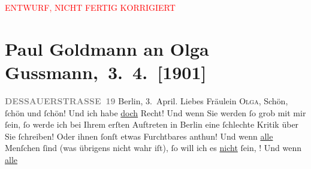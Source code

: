 
\begin{center}
            \textcolor{red}{ENTWURF, NICHT FERTIG KORRIGIERT}
                      \end{center}
            
         
         \renewcommand{\erwaehntePersonen}{Personen: Marie Glümer, Paul Goldmann, Olga Schnitzler, Elisabeth Steinrück, Ernst von Wolzogen}
         \renewcommand{\erwaehnteInstitutionen}{Institutionen: Überbrettl}
         \renewcommand{\erwaehnteOrte}{Orte: Berlin, Dessauer Straße, Wien}
         \renewcommand{\erwaehnteWerke}{}
               \section[ Paul Goldmann an Olga Gussmann, 3. 4. {[}1901{]}]{ Paul Goldmann an Olga Gussmann, 3. 4. {[}1901{]}}\nopagebreak{}\rehead{ }\begin{ledgroupsized}[t]{13cm}\normalsize\beginnumbering{} \toendnotes[C]{\smallbreak\pagebreak[2]} 
\toendnotes[C]{\smallbreak}\pstart
           \noindent{}\raggedleft{}{\pb}\textcolor{gray}{\textbf{DESSAUERSTRASSE 19}}\pend
           \pstart
           Berlin, 3. April.\pend
           \pstart\center{}Liebes Fräulein \textsc{Olga},\pend\pstart
           Schön, ſchön und ſchön! Und ich habe \uline{doch} Recht! Und
               wenn Sie werden ſo grob mit mir ſein, ſo werde ich bei Ihrem erſten Auftreten in Berlin eine ſchlechte Kritik über Sie ſchreiben!
               Oder ihnen ſonſt etwas Furchtbares anthun! Und wenn \uline{alle} Menſchen \label{K_L03525-1v}\label{K_L03525-1h} ſind (was übrigens nicht wahr iſt), ſo will ich es \uline{nicht} ſein, \label{K_L03525-2v}\label{K_L03525-2h}! Und wenn \uline{alle}

\end{ledgroupsized}
